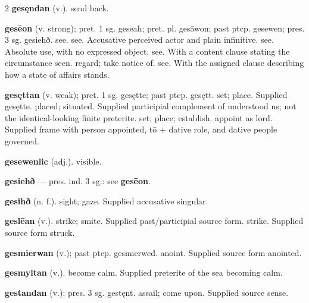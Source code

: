 \begin{multicols*}{2}
\textbf{gesęndan} (v.). send back.\par
\textbf{gesēon} (v. strong); pret. 1 sg. geseah; pret. pl. gesāwon; past ptcp. gesewen; pres. 3 sg. gesiehð. see. see. Accusative perceived actor and plain infinitive. see. Absolute use, with no expressed object. see. With a content clause stating the circumstance seen. regard; take notice of. see. With the assigned clause describing how a state of affairs stands.\par
\textbf{gesęttan} (v. weak); pret. 1 sg. gesętte; past ptcp. gesętt. set; place. Supplied gesętte. placed; situated. Supplied participial complement of understood us; not the identical-looking finite preterite. set; place; establish. appoint as lord. Supplied frame with person appointed, tō + dative role, and dative people governed.\par
\textbf{gesewenlic} (adj.). visible.\par
\textbf{gesiehð} — pres. ind. 3 sg.: see \textbf{gesēon}.\par
\textbf{gesihð} (n. f.). sight; gaze. Supplied accusative singular.\par
\textbf{geslēan} (v.). strike; smite. Supplied past/participial source form. strike. Supplied source form struck.\par
\textbf{gesmierwan} (v.); past ptcp. gesmierwed. anoint. Supplied source form anointed.\par
\textbf{gesmyltan} (v.). become calm. Supplied preterite of the sea becoming calm.\par
\textbf{gestandan} (v.); pres. 3 sg. gestęnt. assail; come upon. Supplied source sense.\par

\end{multicols*}
